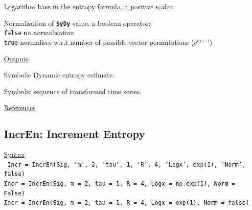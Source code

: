 \documentclass[12pt, a4paper, titlepage, openany]{book}
\begin{document}
\begin{description}[labelsep=1cm, labelwidth=2cm, nosep, style=multiline,leftmargin=3cm]
\begin{description}[labelsep=5em, labelwidth=8em, nosep,style=multiline,leftmargin=3cm]
	\end{description}
\item[\texttt{Logx}]	Logarithm base in the entropy formula, a positive scalar.
\item[\texttt{Norm}]    Normalisation of \texttt{\textbf{SyDy}} value, a boolean operator:\\
		  \texttt{false} \hspace{10pt} no normalisation \\
		  \texttt{true} \hspace{15pt}  normalises w.r.t number of possible vector permutations ($c^{m+1}$) \\
\end{description}

\noindent \ul{Outputs}
\begin{description}[labelsep=1cm, labelwidth=2cm, nosep, style=multiline,leftmargin=3cm]\footnotesize
\item[\texttt{SyDy}]		Symbolic Dynamic entropy estimate.
\item[\texttt{Zt}]		Symbolic sequence of transformed time series.
\end{description}

\noindent \ul{References}\hspace{1cm}
\cite{SyDy1} \cite{SyDy2} \cite{SyDy3}



\newpage
\subsection{\normalsize IncrEn: \hspace{15mm} Increment Entropy}\label{IncrEn}
\noindent\ul{Syntax} \vspace{6mm} \\ \noindent \texttt{\footnotesize
Incr = IncrEn(Sig, ‘m’, 2, ‘tau’, 1, ‘R’, 4, ‘Logx’, exp(1), 'Norm', false) \\
Incr = IncrEn(Sig, m = 2, tau = 1, R = 4, Logx = np.exp(1), Norm = False) \\
Incr = IncrEn(Sig, m = 2, tau = 1, R = 4, Logx = exp(1), Norm = false)}
\end{document}
